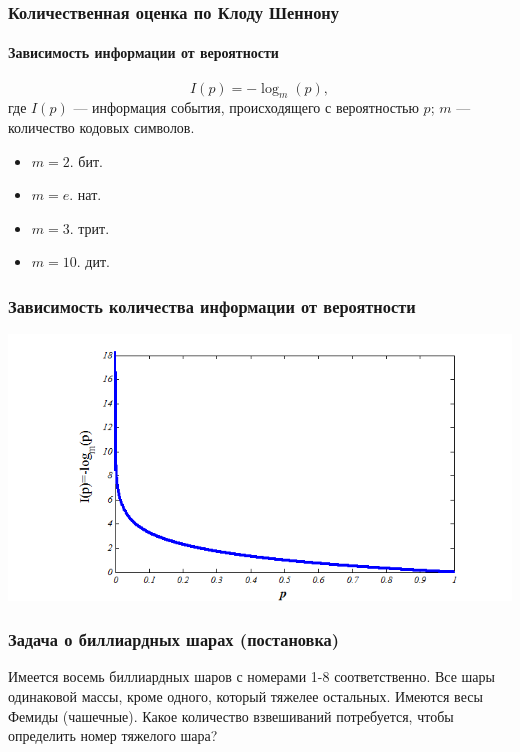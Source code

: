 \begin{frame}
    \frametitle{Количественная оценка по Клоду Шеннону}
    \framesubtitle{Зависимость информации от вероятности}
    
    \[
        I(p)=-\log_{m}(p),
    \]
    где $I(p)$ --- информация события, происходящего с вероятностью $p$; $m$ --- количество \alert{кодовых символов}.
    
    \begin{example}
        \begin{itemize}
            \item $m=2$. \alert{бит}.
            \item $m=e$. \alert{нат}.
            \item $m=3$. \alert{трит}.
            \item $m=10$. \alert{дит}.
        \end{itemize}    
    \end{example}
\end{frame}

\begin{frame}
    \frametitle{Зависимость количества информации от вероятности}
    
    \begin{center}
        \includegraphics[width=.8\textwidth]{fig/ip}
    \end{center} 
\end{frame}

\begin{frame}
    \frametitle{Задача о биллиардных шарах (постановка)}
    \begin{example}
        Имеется восемь биллиардных шаров с номерами 1-8 соответственно. Все шары одинаковой массы, кроме одного, который тяжелее остальных. Имеются весы Фемиды (чашечные). Какое количество взвешиваний потребуется, чтобы определить номер тяжелого шара?
    \end{example} 
\end{frame}

